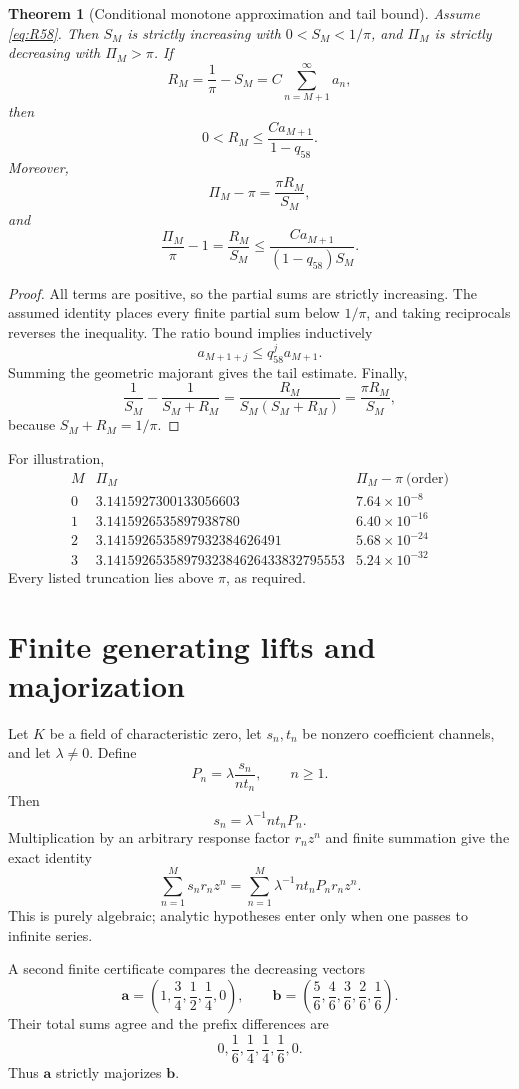 \documentclass[11pt]{amsart}
\newtheorem{theorem}{Theorem}[section]
\theoremstyle{definition}
\theoremstyle{remark}
\begin{document}
\begin{theorem}[Conditional monotone approximation and tail bound]\label{thm:precision}
Assume \eqref{eq:R58}. Then $S_M$ is strictly increasing with $0<S_M<1/\pi$, and $\Pi_M$ is strictly decreasing with $\Pi_M>\pi$. If
\[
 R_M=\frac1\pi-S_M=C\sum_{n=M+1}^\infty a_n,
\]
then
\[
 0<R_M\le\frac{Ca_{M+1}}{1-q_{58}}.
\]
Moreover,
\[
 \Pi_M-\pi=\frac{\pi R_M}{S_M},
\]
and
\[
 \frac{\Pi_M}{\pi}-1
 =\frac{R_M}{S_M}
 \le\frac{Ca_{M+1}}{(1-q_{58})S_M}.
\]
\end{theorem}

\begin{proof}
All terms are positive, so the partial sums are strictly increasing. The assumed identity places every finite partial sum below $1/\pi$, and taking reciprocals reverses the inequality. The ratio bound implies inductively
\[
 a_{M+1+j}\le q_{58}^j a_{M+1}.
\]
Summing the geometric majorant gives the tail estimate. Finally,
\[
 \frac1{S_M}-\frac1{S_M+R_M}
 =\frac{R_M}{S_M(S_M+R_M)}
 =\frac{\pi R_M}{S_M},
\]
because $S_M+R_M=1/\pi$.
\end{proof}

For illustration,
\[
\begin{array}{c|c|c}
M&\Pi_M&\Pi_M-\pi\ \text{(order)}\\ \hline
0&3.1415927300133056603&7.64\times10^{-8}\\
1&3.1415926535897938780&6.40\times10^{-16}\\
2&3.1415926535897932384626491&5.68\times10^{-24}\\
3&3.1415926535897932384626433832795553&5.24\times10^{-32}
\end{array}
\]
Every listed truncation lies above $\pi$, as required.

\section{Finite generating lifts and majorization}\label{sec:majorization}

Let $K$ be a field of characteristic zero, let $s_n,t_n$ be nonzero coefficient channels, and let $\lambda\ne0$. Define
\[
 P_n=\lambda\frac{s_n}{nt_n},\qquad n\ge1.
\]
Then
\[
 s_n=\lambda^{-1}nt_nP_n.
\]
Multiplication by an arbitrary response factor $r_nz^n$ and finite summation give the exact identity
\[
 \sum_{n=1}^M s_nr_nz^n
 =\sum_{n=1}^M\lambda^{-1}nt_nP_nr_nz^n.
\]
This is purely algebraic; analytic hypotheses enter only when one passes to infinite series.

A second finite certificate compares the decreasing vectors
\[
 \mathbf a=\left(1,\frac34,\frac12,\frac14,0\right),
 \qquad
 \mathbf b=\left(\frac56,\frac46,\frac36,\frac26,\frac16\right).
\]
Their total sums agree and the prefix differences are
\[
 0,\frac16,\frac14,\frac14,\frac16,0.
\]
Thus $\mathbf a$ strictly majorizes $\mathbf b$.
\end{document}
